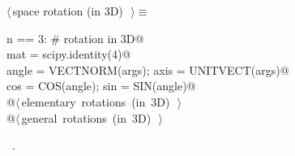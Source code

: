 \documentclass[11pt,oneside]{article}	%
\begin{document}
\begin{flushleft} \small \label{scrap28}
$\langle\,$space rotation (in 3D)\nobreak\ {\footnotesize {}}$\,\rangle\equiv$
\vspace{-1ex}
\begin{list}{}{} \item
\mbox{}\verb@if n == 3: # rotation in 3D@\\
\mbox{}\verb@   mat = scipy.identity(4)@\\
\mbox{}\verb@   angle = VECTNORM(args); axis = UNITVECT(args)@\\
\mbox{}\verb@   cos = COS(angle); sin = SIN(angle)@\\
\mbox{}\verb@   @\hbox{$\langle\,$elementary rotations (in 3D)\nobreak\ {\footnotesize {}}$\,\rangle$}\verb@@\\
\mbox{}\verb@   @\hbox{$\langle\,$general rotations (in 3D)\nobreak\ {\footnotesize {}}$\,\rangle$}\verb@@\\
\mbox{}\verb@@{\NWsep}
\end{list}
\vspace{-1ex}
\footnotesize\addtolength{\baselineskip}{-1ex}
\begin{list}{}{\setlength{\itemsep}{-\parsep}\setlength{\itemindent}{-\leftmargin}}
\item \NWtxtMacroRefIn\ .
\end{list}
\end{flushleft}
\end{document}
